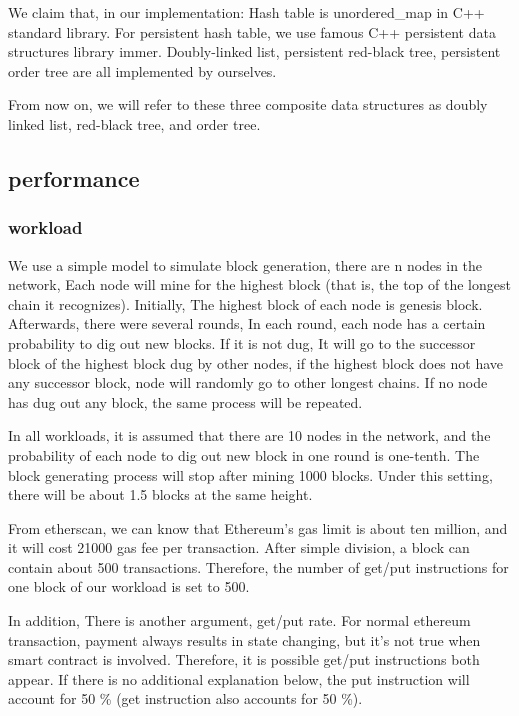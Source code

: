 \documentclass[conference]{IEEEtran}
\begin{document}
We claim that, in our implementation:
Hash table is unordered\_map in C++ standard library.
For persistent hash table, we use famous C++
persistent data structures library immer.
Doubly-linked list, persistent red-black tree,
persistent order tree are all implemented by ourselves.

From now on, we will refer to these three composite data structures
as doubly linked list, red-black tree, and order tree.

\subsection{performance}

\subsubsection{workload}
We use a simple model to simulate block generation,
there are n nodes in the network,
Each node will mine for the highest block
(that is, the top of the longest chain it recognizes).
Initially, The highest block of each node
is genesis block. Afterwards, there were several rounds,
In each round, each node has a certain probability
to dig out new blocks. If it is not dug,
It will go to the successor block of the
highest block dug by other nodes,
if the highest block does not have any successor block,
node will randomly go to other longest chains.
If no node has dug out any block,
the same process will be repeated.

In all workloads, it is assumed that there
are 10 nodes in the network, and the probability
of each node to dig out new block in one round is one-tenth.
The block generating process will stop after mining 1000 blocks.
Under this setting, there will be about
1.5 blocks at the same height.

From etherscan, we can
know that Ethereum's gas limit is about ten million, and
it will cost 21000 gas fee per transaction.
After simple division, a block can contain about 500 transactions.
Therefore, the number of get/put instructions
for one block of our workload is set to 500.

In addition, There is another argument, get/put rate.
For normal ethereum transaction,
payment always results in state changing,
but it's not true when smart contract is involved.
Therefore, it is possible get/put instructions both appear.
If there is no additional explanation below,
the put instruction will account for 50 \% (get instruction also accounts for 50 \%).
\end{document}

